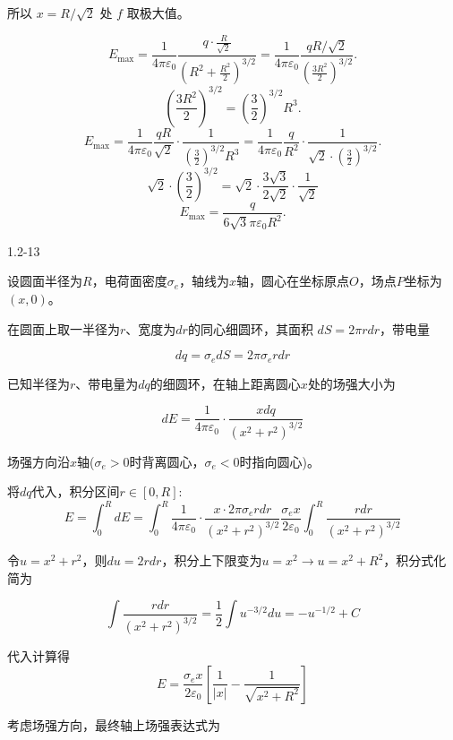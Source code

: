 \documentclass{article}
\begin{document}
所以 $ x = R/\sqrt{2} $ 处 $ f $ 取极大值。

$$E_{\max} = \frac{1}{4\pi\varepsilon_0} \frac{q \cdot \frac{R}{\sqrt{2}}}{\left(R^2 + \frac{R^2}{2}\right)^{3/2}}= \frac{1}{4\pi\varepsilon_0} \frac{q R/\sqrt{2}}{\left(\frac{3R^2}{2}\right)^{3/2}}.$$
$$\left(\frac{3R^2}{2}\right)^{3/2} = \left(\frac{3}{2}\right)^{3/2} R^3.$$
$$E_{\max} = \frac{1}{4\pi\varepsilon_0} \frac{q R}{\sqrt{2}} \cdot \frac{1}{\left(\frac{3}{2}\right)^{3/2} R^3}= \frac{1}{4\pi\varepsilon_0} \frac{q}{R^2} \cdot \frac{1}{\sqrt{2} \cdot \left(\frac{3}{2}\right)^{3/2}}.$$
$$\sqrt{2} \cdot \left(\frac{3}{2}\right)^{3/2} = \sqrt{2} \cdot \frac{3\sqrt{3}}{2\sqrt{2}} \cdot \frac{1}{\sqrt{2}}$$
$$E_{\max} =\frac{q}{6\sqrt{3}\pi\varepsilon_0R^2}.$$




\newpage

1.2-13


设圆面半径为$R$，电荷面密度$\sigma_e$，轴线为$x$轴，圆心在坐标原点$O$，场点$P$坐标为$(x, 0)$。

在圆面上取一半径为$r$、宽度为$dr$的同心细圆环，其面积 $dS = 2\pi r dr$，带电量

$$dq = \sigma_e dS = 2\pi\sigma_e r dr$$

已知半径为$r$、带电量为$dq$的细圆环，在轴上距离圆心$x$处的场强大小为

$$dE = \frac{1}{4\pi\varepsilon_0} \cdot \frac{x dq}{(x^2 + r^2)^{3/2}}$$

场强方向沿$x$轴($\sigma_e>0$时背离圆心，$\sigma_e<0$时指向圆心)。

将$dq$代入，积分区间$r \in [0, R]$:
$$E= \int_0^R dE = \int_0^R \frac{1}{4\pi\varepsilon_0} \cdot \frac{x \cdot 2\pi\sigma_e r dr}{(x^2 + r^2)^{3/2}} \frac{\sigma_e x}{2\varepsilon_0} \int_0^R \frac{r dr}{(x^2 + r^2)^{3/2}}$$

令$u = x^2 + r^2$，则$du = 2r dr$，积分上下限变为$u=x^2 \to u=x^2+R^2$，积分式化简为

$$\int \frac{r dr}{(x^2 + r^2)^{3/2}} = \frac{1}{2}\int u^{-3/2} du = -u^{-1/2} + C$$

代入计算得
$$E = \frac{\sigma_e x}{2\varepsilon_0} \left[ \frac{1}{|x|} - \frac{1}{\sqrt{x^2 + R^2}} \right]$$

考虑场强方向，最终轴上场强表达式为
\end{document}
